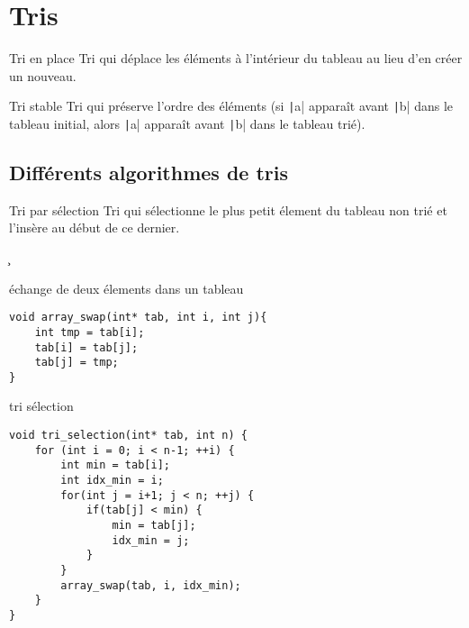 \section{Tris}
\begin{df*}{Tri en place}
Tri qui déplace les éléments à l'intérieur du tableau au lieu d'en créer un nouveau.
\end{df*}
\begin{df*}{Tri stable}
Tri qui préserve l'ordre des éléments (si \texttt|a| apparaît avant \texttt|b| dans le tableau initial, alors \texttt|a| apparaît avant \texttt|b| dans le tableau trié).
\end{df*}
\subsection{Différents algorithmes de tris}
\begin{df*}{Tri par sélection}
Tri qui sélectionne le plus petit élement du tableau non trié et l'insère au début de ce dernier.
\end{df*}
\c
\begin{imp*}{échange de deux élements dans un tableau}
\begin{verbatim}
void array_swap(int* tab, int i, int j){
    int tmp = tab[i];
    tab[i] = tab[j];
    tab[j] = tmp;
}
\end{verbatim}
\end{imp*}
\begin{imp*}{tri sélection}
\begin{verbatim}
void tri_selection(int* tab, int n) {
    for (int i = 0; i < n-1; ++i) {
        int min = tab[i];
        int idx_min = i;
        for(int j = i+1; j < n; ++j) {
            if(tab[j] < min) {
                min = tab[j];
                idx_min = j;
            }
        }
        array_swap(tab, i, idx_min);
    }
}
\end{verbatim}
\end{imp*}